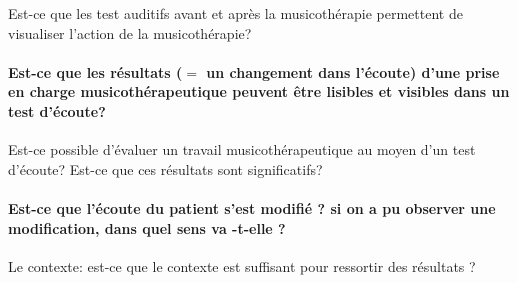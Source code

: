 Est-ce que les test auditifs avant et après la musicothérapie permettent
de visualiser l'action de la musicothérapie?


\paragraph{Est-ce que les résultats ($=$ un changement dans l'écoute) d'une prise
en charge musicothérapeutique peuvent être lisibles et visibles dans
un test d'écoute?}
Est-ce possible d'évaluer un travail musicothérapeutique au moyen
d'un test d'écoute?
Est-ce que ces résultats sont significatifs? 

\paragraph{Est-ce que l'écoute du patient s'est modifié ? si on a pu observer
une modification, dans quel sens va -t-elle ?}

Le contexte: 
est-ce que le contexte est suffisant pour
ressortir des résultats ?





